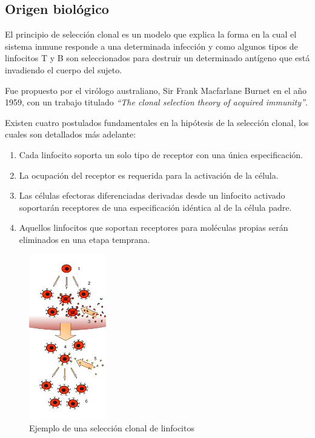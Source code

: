 
\subsection{Origen biológico}

El principio de selección clonal es un modelo que explica la forma en la cual el sistema inmune
responde a una determinada infección y como algunos tipos de linfocitos T y B son seleccionados
para destruir un determinado antígeno que está invadiendo el cuerpo del sujeto.

Fue propuesto por el virólogo australiano, Sir Frank Macfarlane Burnet en el año 1959,
con un trabajo titulado \emph{``The clonal selection theory of acquired immunity''}.

Existen cuatro postulados fundamentales en la hipótesis de la selección clonal, los cuales son detallados más adelante:
\begin{enumerate}
	\item Cada linfocito soporta un solo tipo de receptor con una única especificación.
	\item La ocupación del receptor es requerida para la activación de la célula.
	\item Las células efectoras diferenciadas derivadas desde un linfocito activado soportarán receptores de una especificación idéntica al de la célula padre.
	\item Aquellos linfocitos que soportan receptores para moléculas propias serán eliminados en una etapa temprana.
\end{enumerate}

\begin{figure}[h!]
\begin{center}
\includegraphics[width=0.3\textwidth, height=!]{img/clonalSelection.pdf}
\end{center}
\caption{Ejemplo de una selección clonal de linfocitos}
\label{fig:clonalSelection}
\end{figure}

